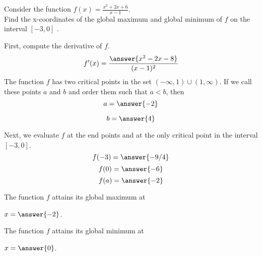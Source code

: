 \documentclass{ximera}
\author{Steven Gubkin \and Nela Lakos}
\begin{document}
\begin{exercise}

Consider the function $f(x) =\frac{x^2+2x+6}{x-1}$. \\
Find the x-coordinates of the global maximum and global minimum of $f$ on the interval $ [-3,0]$ .
\begin{hint}
First, compute the derivative of $f$.
$$
f'(x) = \frac{\answer{x^2-2x-8}}{(x-1)^2}
$$
The function $f$ has two critical points in the set $(-\infty,1)\cup (1,\infty)$. 
 If we call these points $a$ and $b$ and order them such
that $a < b $, then
$$
a = \answer{-2}
$$

$$
b=\answer{4}
$$
\end {hint}

\begin{hint}

Next, we evaluate $f$ at the end points and at  the only critical point in the interval $ [-3,0]$.
$$
f(-3) = \answer{-9/4}
$$
$$
f(0)=\answer{-6}
$$
$$
f(a)=\answer{-2}
$$
\end {hint}

The function $f$ attains its global maximum at	
\begin{prompt}
$x=\answer{-2}$.
\end{prompt}
The function $f$ attains its global minimum at	
\begin{prompt}
$x=\answer{0}$.
\end{prompt}
\end{exercise}
\end{document}

